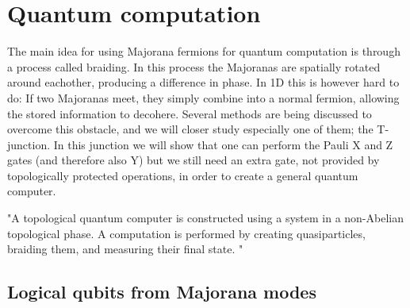 \chapter{Quantum computation} \label{chap:Quantum_computation}
The main idea for using Majorana fermions for quantum computation is through a process called braiding. In this process the Majoranas are spatially rotated around eachother, producing a difference in phase. In 1D this is however hard to do: If two Majoranas meet, they simply combine into a normal fermion, allowing the stored information to decohere. Several methods are being discussed to overcome this obstacle, and we will closer study especially one of them; the T-junction. In this junction we will show that one can perform the Pauli X and Z gates (and therefore also Y) but we still need an extra gate, not provided by topologically protected operations, in order to create a general quantum computer.

"A topological quantum computer is constructed using a system in a non-Abelian topological phase. A computation is
performed by creating quasiparticles, braiding them, and measuring their final state. " \cite{nayakNonAbelianAnyonsTopological2008}

\section{Logical qubits from Majorana modes}

